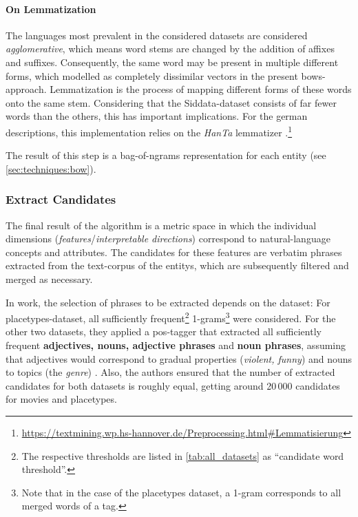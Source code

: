 \paragraph{On Lemmatization}
The languages most prevalent in the considered datasets are considered \textit{agglomerative}, which means word stems are changed by the addition of affixes and suffixes. Consequently, the same word may be present in multiple different forms, which modelled as completely dissimilar vectors in the present \glspl{bow}-approach. Lemmatization is the process of mapping different forms of these words onto the same stem. Considering that the Siddata-dataset consists of far fewer words than the others, this has important implications. For the german descriptions, this implementation relies on the \textit{HanTa} lemmatizer \cite{Wartena2020}.\footnote{\url{https://textmining.wp.hs-hannover.de/Preprocessing.html\#Lemmatisierung}}

The result of this step is a bag-of-ngrams representation for each entity (see \autoref{sec:techniques:bow}).


\subsubsection{Extract Candidates}
\label{sec:extract_cands}

The final result of the algorithm is a metric space in which the individual dimensions (\emph{\glspl{feature}}/\emph{interpretable directions}) correspond to natural-language concepts and attributes. The candidates for these features are verbatim phrases extracted from the text-corpus of the \glspl{entity}, which are subsequently filtered and merged as necessary.

In  work, the selection of phrases to be extracted depends on the dataset: For placetypes-dataset, all sufficiently frequent\footnote{\label{fnote:cand_thresholds}The respective thresholds are listed in \autoref{tab:all_datasets} as ``candidate word threshold''.} 1-grams\footnote{Note that in the case of the placetypes dataset, a 1-gram corresponds to all merged words of a tag.} were considered. For the other two datasets, they applied a \gls{pos}-tagger that extracted all sufficiently frequent \textbf{adjectives, nouns, adjective phrases} and \textbf{noun phrases}, assuming that adjectives would correspond to gradual properties (\eg \textit{violent, funny}) and nouns to topics (\eg the \textit{genre}) \cite[Sec. 4.2.1]{Derrac2015}. Also, the authors ensured that the number of extracted candidates for both datasets is roughly equal, getting around 20\,000 candidates for movies and placetypes.

